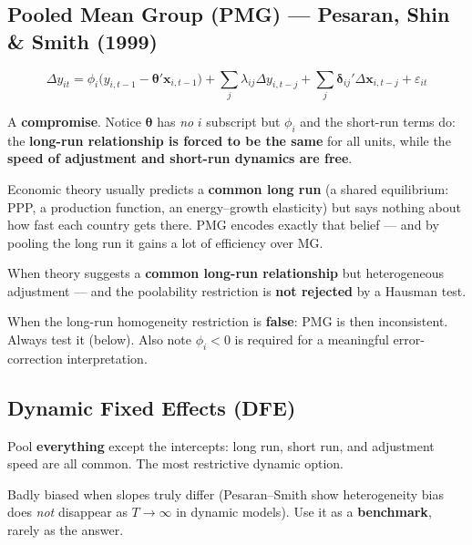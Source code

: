 \documentclass[11pt,a4paper]{article}
\newcommand{\hlt}[2]{\textcolor{#1}{\textbf{#2}}}
\newcommand{\btheta}{\boldsymbol{\theta}}
\newcommand{\bx}{\mathbf{x}}
\newcommand{\bdelta}{\boldsymbol{\delta}}
\begin{document}
\subsection{Pooled Mean Group (PMG) --- Pesaran, Shin \& Smith (1999)}
\begin{eqbox}
\[ \Delta y_{it}=\phi_i\Big(y_{i,t-1}-\btheta'\bx_{i,t-1}\Big)
+\sum_{j}\lambda_{ij}\Delta y_{i,t-j}+\sum_{j}\bdelta_{ij}'\Delta\bx_{i,t-j}+\varepsilon_{it} \]
\end{eqbox}
\begin{idea}
A \textbf{compromise}. Notice $\btheta$ has \emph{no} $i$ subscript but $\phi_i$ and the short-run
terms do: the \hlt{cred}{long-run relationship is forced to be the same} for all units, while the
\hlt{cgreen}{speed of adjustment and short-run dynamics are free}.
\end{idea}
\begin{begbox}
Economic theory usually predicts a \textbf{common long run} (a shared equilibrium: PPP, a
production function, an energy--growth elasticity) but says nothing about how fast each country
gets there. PMG encodes exactly that belief --- and by pooling the long run it gains a lot of
efficiency over MG.
\end{begbox}
\begin{whenbox}
When theory suggests a \textbf{common long-run relationship} but heterogeneous adjustment ---
and the poolability restriction is \textbf{not rejected} by a Hausman test.
\end{whenbox}
\begin{avoidbox}
When the long-run homogeneity restriction is \textbf{false}: PMG is then inconsistent. Always test
it (below). Also note $\phi_i<0$ is required for a meaningful error-correction interpretation.
\end{avoidbox}

\subsection{Dynamic Fixed Effects (DFE)}
\begin{idea}
Pool \textbf{everything} except the intercepts: long run, short run, and adjustment speed are all
common. The most restrictive dynamic option.
\end{idea}
\begin{avoidbox}
Badly biased when slopes truly differ (Pesaran--Smith show heterogeneity bias does \emph{not}
disappear as $T\to\infty$ in dynamic models). Use it as a \textbf{benchmark}, rarely as the answer.
\end{avoidbox}
\end{document}

